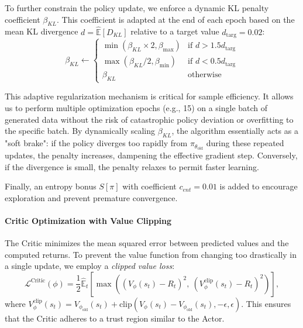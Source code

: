 \documentclass[letterpaper]{article} %
\begin{document}
To further constrain the policy update, we enforce a dynamic KL penalty coefficient $\beta_{KL}$. This coefficient is adapted at the end of each epoch based on the mean KL divergence $d = \hat{\mathbb{E}}[D_{KL}]$ relative to a target value $d_{\text{targ}} = 0.02$:
\begin{equation}
    \beta_{KL} \leftarrow 
    \begin{cases} 
      \min(\beta_{KL} \times 2, \beta_{\max}) & \text{if } d > 1.5 d_{\text{targ}} \\
      \max(\beta_{KL} / 2, \beta_{\min}) & \text{if } d < 0.5 d_{\text{targ}} \\
      \beta_{KL} & \text{otherwise}
    \end{cases}
\end{equation}

This adaptive regularization mechanism is critical for sample efficiency. It allows us to perform multiple optimization epochs (e.g., 15) on a single batch of generated data without the risk of catastrophic policy deviation or overfitting to the specific batch. By dynamically scaling $\beta_{KL}$, the algorithm essentially acts as a "soft brake": if the policy diverges too rapidly from $\pi_{\theta_{\text{old}}}$ during these repeated updates, the penalty increases, dampening the effective gradient step. Conversely, if the divergence is small, the penalty relaxes to permit faster learning.


Finally, an entropy bonus $S[\pi]$ with coefficient $c_{ent}=0.01$ is added to encourage exploration and prevent premature convergence.

\paragraph{Critic Optimization with Value Clipping}
The Critic minimizes the mean squared error between predicted values and the computed returns. To prevent the value function from changing too drastically in a single update, we employ a \textit{clipped value loss}:
\begin{equation}
    \mathcal{L}^{\text{Critic}}(\phi) = \frac{1}{2} \hat{\mathbb{E}}_t \left[ \max \left( (V_{\phi}(s_t) - R_t)^2, \ (V_{\phi}^{\text{clip}}(s_t) - R_t)^2 \right) \right],
\end{equation}
where $V_{\phi}^{\text{clip}}(s_t) = V_{\phi_{\text{old}}}(s_t) + \text{clip}(V_{\phi}(s_t) - V_{\phi_{\text{old}}}(s_t), -\epsilon, \epsilon)$. This ensures that the Critic adheres to a trust region similar to the Actor.
\end{document}
